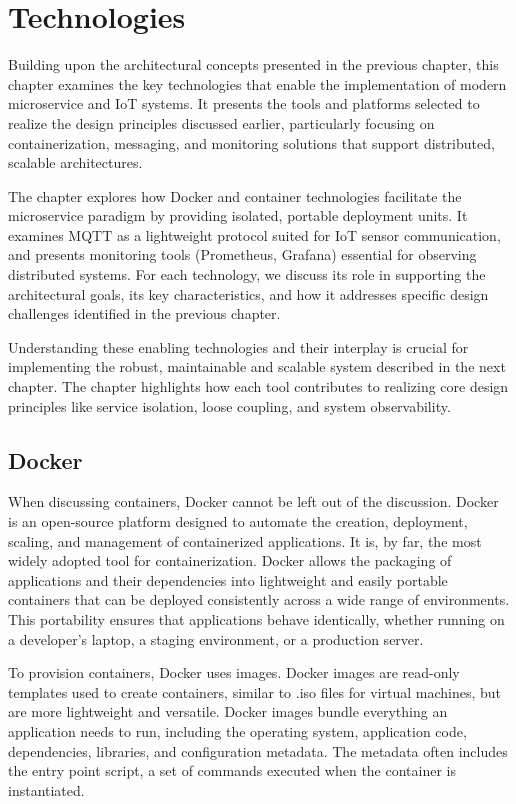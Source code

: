 \chapter{Technologies} \label{ch:technologies}

Building upon the architectural concepts presented in the previous chapter, this chapter examines the key technologies that enable the implementation of modern microservice and IoT systems. It presents the tools and platforms selected to realize the design principles discussed earlier, particularly focusing on containerization, messaging, and monitoring solutions that support distributed, scalable architectures.

The chapter explores how Docker and container technologies facilitate the microservice paradigm by providing isolated, portable deployment units. It examines MQTT as a lightweight protocol suited for IoT sensor communication, and presents monitoring tools (Prometheus, Grafana) essential for observing distributed systems. For each technology, we discuss its role in supporting the architectural goals, its key characteristics, and how it addresses specific design challenges identified in the previous chapter.

Understanding these enabling technologies and their interplay is crucial for implementing the robust, maintainable and scalable system described in the next chapter. The chapter highlights how each tool contributes to realizing core design principles like service isolation, loose coupling, and system observability.

\section{Docker}
When discussing containers, Docker cannot be left out of the discussion. Docker is an open-source platform designed to automate the creation, deployment, scaling, and management of containerized applications. It is, by far, the most widely adopted tool for containerization. Docker allows the packaging of applications and their dependencies into lightweight and easily portable containers that can be deployed consistently across a wide range of environments. This portability ensures that applications behave identically, whether running on a developer's laptop, a staging environment, or a production server.

To provision containers, Docker uses images. Docker images are read-only templates used to create containers, similar to .iso files for virtual machines, but are more lightweight and versatile. Docker images bundle everything an application needs to run, including the operating system, application code, dependencies, libraries, and configuration metadata. The metadata often includes the entry point script, a set of commands executed when the container is instantiated.

